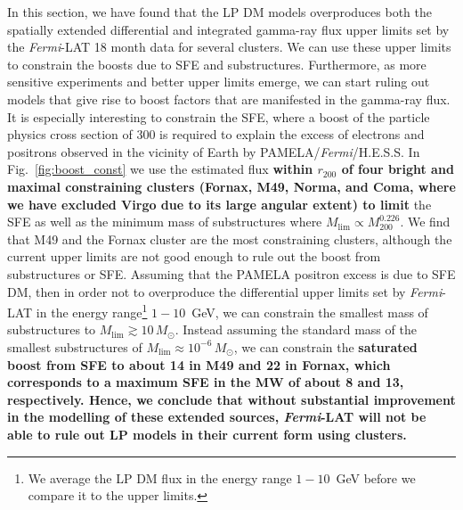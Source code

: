 \documentclass[10pt,aps,pra,reprint,amsmath,amsfonts,amssymb,showpacs,nofootinbib,floatfix]{revtex4-1}
\def\del#1{{}}
\def\C#1{{\bf #1}}
\newcommand{\Fermi}{{\em Fermi}\xspace}
\newcommand{\rmn}{\mathrm}
\newcommand{\msun}{M_\odot}
\newcommand{\rvir}{r_{200}}
\newcommand{\mvir}{M_{200}}
\begin{document}
In this section, we have found that the LP DM models overproduces both
the spatially extended differential and integrated gamma-ray flux
upper limits set by the \Fermi-LAT 18 month data for several
clusters. We can use these upper limits to constrain the boosts due to
SFE and substructures. Furthermore, as more sensitive experiments and
better upper limits emerge, we can start ruling out models that give
rise to boost factors that are manifested in the gamma-ray flux. It is
especially interesting to constrain the SFE, where a boost of the
particle physics cross section of 300 is required to explain the
excess of electrons and positrons observed in the vicinity of Earth by
PAMELA/\Fermi/H.E.S.S. In Fig.~\ref{fig:boost_const} we use the estimated
flux \C{within $\rvir$ of four bright and maximal constraining
  clusters (Fornax, M49, Norma, and Coma, where we have excluded Virgo
  due to its large angular extent) to limit} the SFE as well as the
minimum mass of substructures where
$M_\rmn{lim}\propto\mvir^{0.226}$. We find that M49 and the Fornax
cluster are the most constraining clusters, although the current upper
limits are not good enough to rule out the boost from substructures or
SFE. Assuming that the PAMELA positron excess is due to SFE DM, then
in order not to overproduce the differential upper limits set by
\Fermi-LAT in the energy range\footnote{We average the LP DM flux in
  the energy range $1-10$~GeV before we compare it to the upper
  limits.}  $1-10$~GeV, we can constrain the smallest mass of
substructures to $M_\rmn{lim}\gtrsim 10\,\msun$. Instead assuming the
standard mass of the smallest substructures of $M_\rmn{lim}\approx
10^{-6}\,\msun$, we can constrain the \C{saturated boost from SFE to
  about 14 in M49 and 22 in Fornax, which corresponds to a maximum SFE
  in the MW of about 8 and 13, respectively. Hence, we conclude that
  without substantial improvement in the modelling of these extended
  sources, \Fermi-LAT will not be able to rule out LP models in their
  current form using clusters.} \del{Note that after about six years
  of observations with \Fermi-LAT, we will be able to rule out the LP
  model assuming a substructure boost with a smallest mass of
  $M_\rmn{lim} \approx 10^{-6}\,\msun$.}
\end{document}
